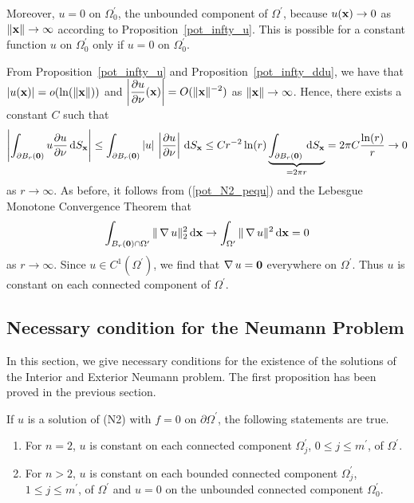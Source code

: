 Moreover, $u=0$ on $\displaystyle \Omega_0^{\prime}$, the unbounded component
of $\displaystyle \Omega^{\prime}$, because $u(\mathbf{x}) \rightarrow 0$ as
$\|\mathbf{x}\|\rightarrow \infty$ according to
Proposition~\ref{pot_infty_u}.  This is possible for a constant
function $u$ on $\displaystyle \Omega_0^{\prime}$ only if $u=0$
on $\displaystyle \Omega_0^{\prime}$.

 From Proposition~\ref{pot_infty_u} and
Proposition~\ref{pot_infty_ddu}, we have that
$|u(\mathbf{x})| = o(\ln(\|\mathbf{x}\|))$ and
$\displaystyle \left| \frac{\partial{u}}{\partial \mathbf{\nu}}(\mathbf{x})\right|
= O(\|\mathbf{x}\|^{-2})$ as $\|\mathbf{x}\|\rightarrow \infty$.  Hence,
there exists a constant $C$ such that
\[
\left| \int_{\partial B_r(\mathbf{0})} u \frac{\partial{u}}{\partial \mathbf{\nu}} \,\mathrm{d}{S}_{\mathbf{x}}
\right| \leq
\int_{\partial B_r(\mathbf{0})} \left| u \right|\,\left| \frac{\partial{u}}{\partial \mathbf{\nu}} \right|
\,\mathrm{d}{S}_{\mathbf{x}}
\leq C r^{-2} \ln(r)
\underbrace{\int_{\partial B_r(\mathbf{0})} \,\mathrm{d}{S}_{\mathbf{x}}}_{=2\pi r}
= 2\pi C \frac{\ln(r)}{r} \rightarrow 0
\]
as $r \rightarrow \infty$.
As before, it follows from (\ref{pot_N2_pequ}) and the Lebesgue
Monotone Convergence Theorem that
\[
\int_{B_r(\mathbf{0})\cap\Omega^{\prime}} \| \operatorname{\nabla} u \|_2^2 \,\mathrm{d}{\mathbf{x}} \rightarrow
\int_{\Omega^{\prime}} \| \operatorname{\nabla} u \|^2 \,\mathrm{d}{\mathbf{x}} = 0
\]
as $r \rightarrow \infty$.
Since $\displaystyle u \in C^1(\Omega^{\prime})$, we find that
$\operatorname{\nabla} u = \mathbf{0}$ everywhere on $\displaystyle \Omega^{\prime}$.
Thus $u$ is constant on each connected component of
$\displaystyle \Omega^{\prime}$.

\subsection{Necessary condition for the Neumann Problem}
\label{pot_sect_necessary}

In this section, we give necessary conditions for the existence of the
solutions of the Interior and Exterior Neumann problem.  The first
proposition has been proved in the previous section.

\begin{prop} \label{pot_nec_Nprobl0}
If $u$ is a solution of (N2) with $f=0$ on
$\displaystyle \partial \Omega^{\prime}$, the following statements are true.
\begin{enumerate}
\item For $n=2$, $u$ is constant on each connected component
$\displaystyle \Omega^{\prime}_j$,
$\displaystyle 0\leq j \leq m^{\prime}$, of $\displaystyle \Omega^{\prime}$.
\item For $n>2$, $u$ is constant on each bounded connected component
$\displaystyle \Omega^{\prime}_j$,
$\displaystyle 1\leq j \leq m^{\prime}$, of $\displaystyle \Omega^{\prime}$
and $u=0$ on the unbounded connected component
$\displaystyle \Omega^{\prime}_0$.
\end{enumerate}
\end{prop}

